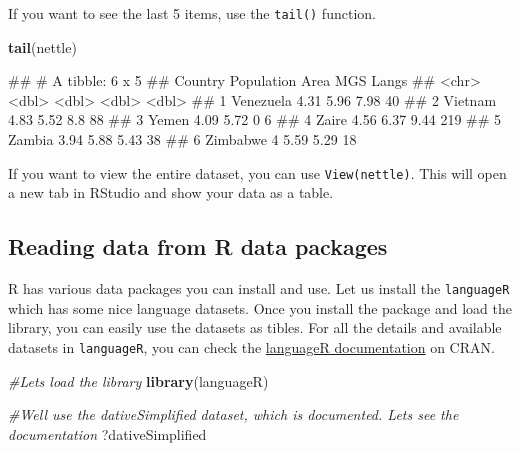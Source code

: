 \documentclass[
]{book}
\newenvironment{Shaded}{\begin{snugshade}}{\end{snugshade}}
\newcommand{\CommentTok}[1]{\textcolor[rgb]{0.56,0.35,0.01}{\textit{#1}}}
\newcommand{\FunctionTok}[1]{\textcolor[rgb]{0.13,0.29,0.53}{\textbf{#1}}}
\newcommand{\NormalTok}[1]{#1}
\begin{document}
If you want to see the last 5 items, use the \texttt{tail()} function.

\begin{Shaded}
\begin{Highlighting}[]
\FunctionTok{tail}\NormalTok{(nettle)}
\end{Highlighting}
\end{Shaded}

\begin{Shaded}
\begin{Highlighting}[]
\NormalTok{\#\# \# A tibble: 6 x 5}
\NormalTok{\#\#   Country   Population  Area   MGS Langs}
\NormalTok{\#\#   \textless{}chr\textgreater{}          \textless{}dbl\textgreater{} \textless{}dbl\textgreater{} \textless{}dbl\textgreater{} \textless{}dbl\textgreater{}}
\NormalTok{\#\# 1 Venezuela       4.31  5.96  7.98    40}
\NormalTok{\#\# 2 Vietnam         4.83  5.52  8.8     88}
\NormalTok{\#\# 3 Yemen           4.09  5.72  0        6}
\NormalTok{\#\# 4 Zaire           4.56  6.37  9.44   219}
\NormalTok{\#\# 5 Zambia          3.94  5.88  5.43    38}
\NormalTok{\#\# 6 Zimbabwe        4     5.59  5.29    18}
\end{Highlighting}
\end{Shaded}

If you want to view the entire dataset, you can use \texttt{View(nettle)}. This will open a new tab in RStudio and show your data as a table.

\subsection{Reading data from R data packages}\label{reading-data-from-r-data-packages}

R has various data packages you can install and use. Let us install the \texttt{languageR} which has some nice language datasets. Once you install the package and load the library, you can easily use the datasets as tibles. For all the details and available datasets in \texttt{languageR}, you can check the \href{https://cran.r-project.org/web/packages/languageR/languageR.pdf}{languageR documentation} on CRAN.

\begin{Shaded}
\begin{Highlighting}[]
\CommentTok{\#Let\textquotesingle{}s load the library}
\FunctionTok{library}\NormalTok{(languageR)}

\CommentTok{\#We\textquotesingle{}ll use the dativeSimplified dataset, which is documented. Let\textquotesingle{}s see the documentation}
\NormalTok{?dativeSimplified}
\end{Highlighting}
\end{Shaded}
\end{document}
